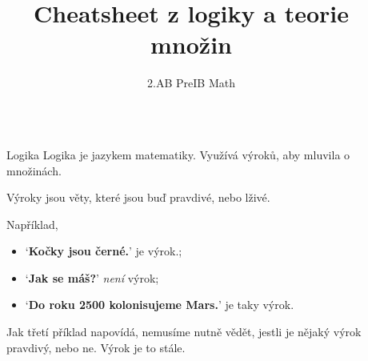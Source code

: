 \documentclass[final]{beamer}
\title{Cheatsheet z logiky a teorie množin}
\author{2.AB PreIB Math}
\institute[shortinst]{Adam Klepáč}
\newlength{\sepwidth}
\newlength{\colwidth}
\newcommand{\separatorcolumn}{
  \begin{column}{\sepwidth}
\end{column}}
\begin{document}

\begin{frame}[t]
  \begin{columns}[t]
    \separatorcolumn

    \begin{column}{\colwidth}

      \begin{block}{Logika}
        \alert{Logika} je jazykem matematiky. Využívá \alert{výroků}, aby
        mluvila o množinách.

        Výroky jsou věty, které jsou buď pravdivé, nebo lživé.

        Například,
        \begin{itemize}[label=\textbullet,left=24pt]
          \item `\textbf{Kočky jsou černé.}' je výrok.;
          \item `\textbf{Jak se máš?}' \emph{není} výrok;
          \item `\textbf{Do roku 2500 kolonisujeme Mars.}' je taky výrok.
        \end{itemize}
      \end{block}
      Jak třetí příklad napovídá, nemusíme nutně vědět, jestli je nějaký výrok
      pravdivý, nebo ne. Výrok je to stále.

      \vspace{1em}


\end{column}
\end{columns}
\end{frame}
\end{document}
